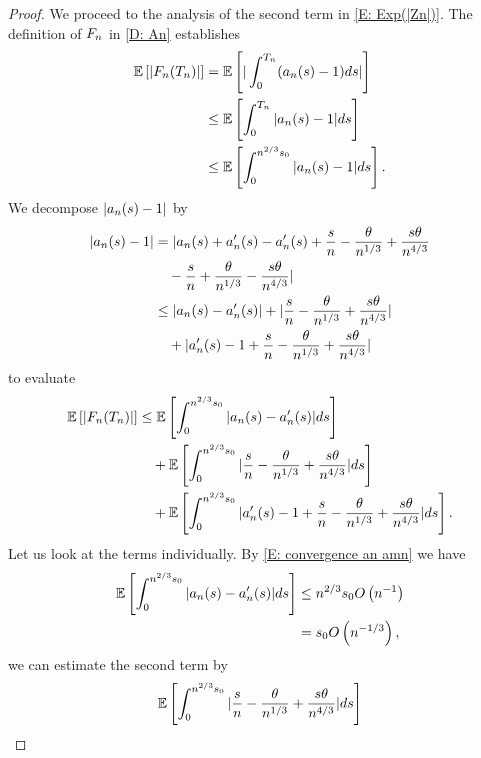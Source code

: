 \begin{proof}
	We proceed to the analysis of the second term in \eqref{E: Exp(|Zn|)}.
	The definition of $F_n$ in \eqref{D: An} establishes
	\begin{equation}
	\begin{aligned}
	\mathbb{E} \left[ |F_n(T_n)| \right] 
	&= \mathbb{E} \left[ |\int_{0}^{T_n}(a_n(s) -1)ds | \right] \\
	&\leq \mathbb{E} \left[ \int_{0}^{T_n} |a_n(s)-1|ds \right] \\
	&\leq \mathbb{E} \left[ \int_{0}^{n^{2 / 3}s_0} |a_n(s)-1|ds \right].
	\end{aligned}
	\end{equation}
	We decompose $|a_n(s) - 1|$ by
	\begin{equation}
	\begin{aligned}
	|a_n(s)-1| 
	&= | a_n(s) + a'_n(s) - a'_n(s) + \frac{s}{n} - \frac{\theta}{n^{1 / 3}} + \frac{s\theta}{n^{4 / 3}} \\
	&\quad	- \frac{s}{n} + \frac{\theta}{n^{1 / 3}} - \frac{s\theta}{n^{4 / 3}} | \\
	&\leq |a_n(s) - a'_n(s)| + 	|\frac{s}{n} - \frac{\theta}{n^{1 / 3}} + \frac{s\theta}{n^{4 / 3}}| \\
	&\quad    + |a'_n(s) - 1 + \frac{s}{n} - \frac{\theta}{n^{1 / 3}} + \frac{s\theta}{n^{4 / 3}}|
	\end{aligned}
	\end{equation}
	to evaluate
	\begin{equation}
	\begin{aligned}
	\mathbb{E} \left[ |F_n(T_n)| \right] 
	&\leq \mathbb{E} \left[ \int_{0}^{n^{2 / 3}s_0} |a_n(s) - a'_n(s)|ds \right] \\
	&\quad + \mathbb{E} \left[ \int_{0}^{n^{2 / 3}s_0} |\frac{s}{n} - \frac{\theta}{n^{1 / 3}} + \frac{s\theta}{n^{4 / 3}}| ds \right] \\
	&\quad + \mathbb{E} \left[ \int_{0}^{n^{2 / 3}s_0} |a'_n(s) - 1 + \frac{s}{n} - \frac{\theta}{n^{1 / 3}} + \frac{s\theta}{n^{4 / 3}}|ds \right].
	\end{aligned}
	\end{equation}
	Let us look at the terms individually. 
	By \eqref{E: convergence an amn} we have
	\begin{equation}
	\begin{aligned}
	\mathbb{E} \left[ \int_{0}^{n^{2 / 3}s_0} |a_n(s) - a'_n(s)|ds \right] 
	&\leq n^{2 / 3}s_0 O\left(n^{-1}\right) \\
	&= s_0 O\left(n^{-1 / 3}\right),
	\end{aligned}
	\end{equation}
	we can estimate the second term by
	\begin{equation}
	\begin{aligned}
	\ExpBig{\int_{0}^{\n{2}{3}s_0} |\frac{s}{n} - \frac{\pp}{\n{1}{3}} + \frac{s\pp}{\n{4}{3}}| ds}

\end{aligned}
\end{equation}
\end{proof}
